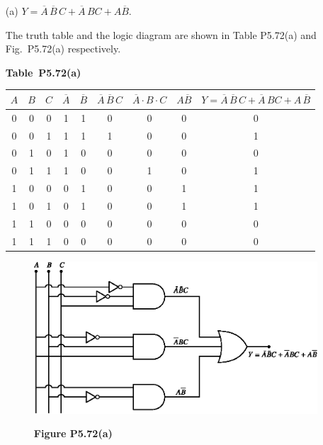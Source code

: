 \begin{solution}
\begin{itemize}
\item[(a)] $Y=\overline{A}\,\overline{B}\,C+\overline{A}\,BC+A\overline{B}$.

The truth table and the logic diagram are shown in Table P5.72(a) and Fig.~P5.72(a) respectively.
\begin{table}[H]
\centering
{\bf Table~P5.72(a)}
\medskip

\renewcommand{\arraystretch}{1.4}
\begin{tabular}{|ccc|c|c|c|c|c|c|}
\hline
\boldmath$A$ & \boldmath$B$ & \boldmath$C$ & \boldmath$\overline{A}$ & \boldmath$\overline{B}$ & \boldmath$\overline{A}\,\overline{B}\,C$ & \boldmath$\overline{A}\cdot B\cdot C$ & \boldmath$A\overline{B}$ & \boldmath$Y=\overline{A}\,\overline{B}\,C+\overline{A}\,BC+A\,\overline{B}$\\
\hline
0 & 0 & 0 & 1 & 1 & 0 & 0 & 0 & 0\\
0 & 0 & 1 & 1 & 1 & 1 & 0 & 0 & 1\\
0 & 1 & 0 & 1 & 0 & 0 & 0 & 0 & 0\\
0 & 1 & 1 & 1 & 0 & 0 & 1 & 0 & 1\\
1 & 0 & 0 & 0 & 1 & 0 & 0 & 1 & 1\\
1 & 0 & 1 & 0 & 1 & 0 & 0 & 1 & 1\\
1 & 1 & 0 & 0 & 0 & 0 & 0 & 0 & 0\\
1 & 1 & 1 & 0 & 0 & 0 & 0 & 0 & 0\\
\hline
\end{tabular}
\end{table}
\begin{figure}[H]
\centering
\includegraphics{chap5/figP5.69a.eps}

\smallskip
{\bf Figure P5.72(a)}
\end{figure}


\end{itemize}
\end{solution}
